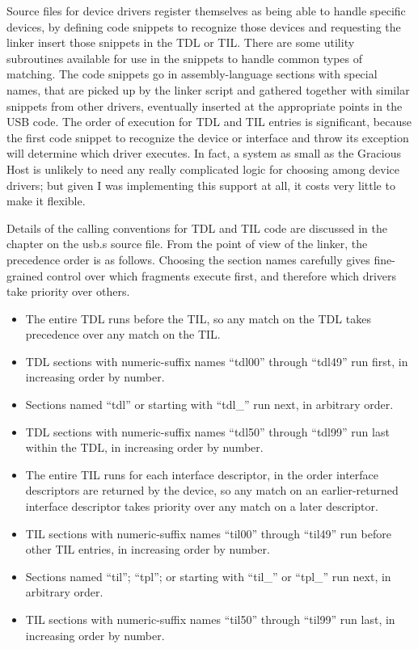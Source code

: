 Source files for device drivers register themselves as being able to handle
specific devices, by defining code snippets to recognize those devices and
requesting the linker insert those snippets in the TDL or TIL.  There are
some utility subroutines available for use in the snippets to handle common
types of matching.  The code snippets go in assembly-language sections with
special names, that are picked up by the linker script and gathered together
with similar snippets from other drivers, eventually inserted at the
appropriate points in the USB code.  The order of execution for TDL and TIL
entries is significant, because the first code snippet to recognize the
device or interface and throw its exception will determine which driver
executes.  In fact, a system as small as the Gracious Host is unlikely to
need any really complicated logic for choosing among device drivers; but
given I was implementing this support at all, it costs very little to make
it flexible.

Details of the calling conventions for TDL and TIL code are discussed in the
chapter on the usb.s source file.  From the point of view of the linker, the
precedence order is as follows.  Choosing the section names carefully gives
fine-grained control over which fragments execute first, and therefore which
drivers take priority over others.

\begin{itemize}
  \item The entire TDL runs before the TIL, so any match on the TDL takes
    precedence over any match on the TIL.
  \item TDL sections with numeric-suffix names ``tdl00'' through ``tdl49'' run
    first, in increasing order by number.
  \item Sections named ``tdl'' or starting with ``tdl\_'' run next, in
    arbitrary order.
  \item TDL sections with numeric-suffix names ``tdl50'' through ``tdl99'' run
    last within the TDL, in increasing order by number.
  \item The entire TIL runs for each interface descriptor, in the order
    interface descriptors are returned by the device, so any match on an
    earlier-returned interface descriptor takes priority over any match on
    a later descriptor.
  \item TIL sections with numeric-suffix names ``til00'' through ``til49''
    run before other TIL entries, in increasing
    order by number.
  \item Sections named ``til''; ``tpl''; or starting with ``til\_'' or
    ``tpl\_'' run next, in arbitrary order.
  \item TIL sections with numeric-suffix names ``til50'' through ``til99''
    run last, in increasing order by number.
\end{itemize}


